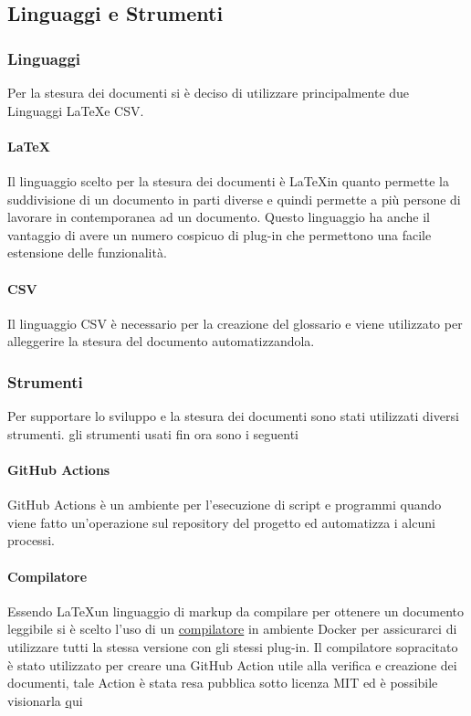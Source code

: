   \subsection{Linguaggi e Strumenti}
  \subsubsection{Linguaggi}
  Per la stesura dei documenti si è deciso di utilizzare principalmente due Linguaggi
  \LaTeX e CSV\glos.
  \paragraph{\LaTeX}
  Il linguaggio scelto per la stesura dei documenti è \LaTeX \space in quanto permette
  la suddivisione di un documento in parti diverse e quindi permette a più persone
  di lavorare in contemporanea ad un documento.
  Questo linguaggio ha anche il vantaggio di avere un numero cospicuo di plug-in
  che permettono una facile estensione delle funzionalità.
  \paragraph{CSV}
  Il linguaggio CSV è necessario per la creazione del glossario e viene utilizzato
  per alleggerire la stesura del documento automatizzandola.

  \subsubsection{Strumenti}
  Per supportare lo sviluppo e la stesura dei documenti sono stati utilizzati diversi
  strumenti.
  gli strumenti usati fin ora sono i seguenti

  \paragraph{GitHub Actions}
  GitHub Actions è un ambiente per l'esecuzione di script e programmi quando viene
  fatto un'operazione sul repository del progetto ed automatizza i alcuni processi.

  \paragraph{Compilatore}
  Essendo \LaTeX \space un linguaggio di markup da compilare per ottenere un documento
  leggibile si è scelto l'uso di un
  \href{https://GitHub.com/dante-ev/docker-texlive}{compilatore} in ambiente Docker\glo
  per assicurarci di utilizzare tutti la stessa versione con gli stessi plug-in.
  Il compilatore sopracitato è stato utilizzato per creare una GitHub Action utile
  alla verifica e creazione dei documenti, tale Action è stata resa pubblica sotto licenza MIT
  ed è possibile visionarla \href{https://GitHub.com/Jatus93/Latex-multicompiler}qui

